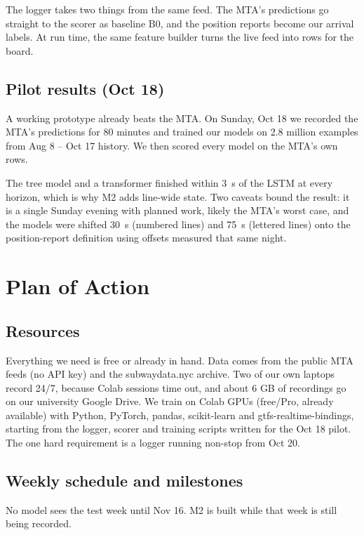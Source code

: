 \documentclass[10pt,letterpaper,twocolumn]{article}
\begin{document}
The logger takes two things from the same feed. The MTA's predictions go straight to the scorer as baseline B0, and the position reports become our arrival labels. At run time, the same feature builder turns the live feed into rows for the board.

\subsection{Pilot results (Oct 18)}

A working prototype already beats the MTA. On Sunday, Oct 18 we recorded the MTA's predictions for 80 minutes and trained our models on 2.8 million examples from Aug 8 -- Oct 17 history. We then scored every model on the MTA's own rows.

The tree model and a transformer finished within 3~s of the LSTM at every horizon, which is why M2 adds line-wide state. Two caveats bound the result: it is a single Sunday evening with planned work, likely the MTA's worst case, and the models were shifted 30~s (numbered lines) and 75~s (lettered lines) onto the position-report definition using offsets measured that same night.

\section{Plan of Action}

\subsection{Resources}

Everything we need is free or already in hand. Data comes from the public MTA feeds (no API key) and the subwaydata.nyc archive. Two of our own laptops record 24/7, because Colab sessions time out, and about 6 GB of recordings go on our university Google Drive. We train on Colab GPUs (free/Pro, already available) with Python, PyTorch, pandas, scikit-learn and gtfs-realtime-bindings, starting from the logger, scorer and training scripts written for the Oct 18 pilot. The one hard requirement is a logger running non-stop from Oct 20.

\subsection{Weekly schedule and milestones}

No model sees the test week until Nov 16. M2 is built while that week is still being recorded.
\end{document}
